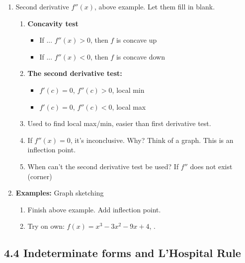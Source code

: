 \documentclass{article}
\begin{document}
\begin{enumerate}
\item Second derivative $f''(x)$, above example. Let them fill in blank.
\begin{enumerate}
\item {\bf Concavity test}
\begin{itemize}
\item If ... $f''(x)>0$, then $f$ is  concave up
\item If ... $f''(x)<0$, then $f$ is  concave down
\end{itemize}
\item {\bf The second derivative test: }
\begin{itemize}
\item $f'(c) = 0$, $f''(c) >0$, local min
\item $f'(c)=0$, $f''(c)<0$, local max
\end{itemize}
\item Used to find local max/min, easier than first derivative test.
\item If $f''(x)=0$, it's inconclusive. Why? Think of a graph. This is an inflection point.
\item When can't the second derivative test be used? If $f''$ does not exist (corner)
\end{enumerate}

\item {\bf Examples:} Graph sketching
\begin{enumerate}
\item Finish above example. Add inflection point.
\item Try on own: $f(x) = x^3-3x^2-9x+4$, .
\end{enumerate}
\end{enumerate}



\subsection{4.4 Indeterminate forms and L'Hospital Rule}
\end{document}
